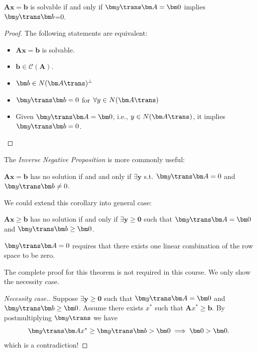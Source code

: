 \begin{corollary}
$\bm{Ax}=\bm b$ is solvable if and only if $\bm y\trans\bm A=\bm 0$ implies $\bm y\trans\bm b$=0.
\end{corollary}
\begin{proof} The following statements are equivalent:
\begin{itemize}
\item
$\bm{Ax}=\bm b$ is solvable.
\item
$\bm b\in \mathcal{C}(\bm A)$.
\item
$\bm b\in N(\bm A\trans)^{\perp}$
\item
$\bm y\trans\bm b=0$ for $\forall y\in N(\bm A\trans)$
\item
Given $\bm y\trans\bm A=\bm 0$, i.e., $y\in N(\bm A\trans)$, it implies $\bm y\trans\bm b=0$.
\end{itemize}
\end{proof}
The \emph{Inverse Negative Proposition} is more commonly useful:
\begin{corollary}
$\bm{Ax}=\bm b$ has no solution if and  and only if $\exists \bm y$ s.t. $\bm y\trans\bm A=0$ and $\bm y\trans\bm b\ne 0$.
\end{corollary}
We could extend this corollary into general case:
\begin{remark}
\begin{theorem}\label{theorem_12.3}
$\bm{Ax}\ge\bm b$ has no solution if and only if $\exists \bm y\ge\bm 0$ such that $\bm y\trans\bm A=\bm 0$ and $\bm y\trans\bm b\ge \bm 0$.
\end{theorem}
$\bm y\trans\bm A=0$ requires that there exists one linear combination of the row space to be zero.

The complete proof for this theorem is not required in this course. We only show the necessity case.
\begin{proof}[Necessity case.]
Suppose $\exists \bm y\ge\bm 0$ such that $\bm y\trans\bm A=\bm 0$ and $\bm y\trans\bm b\ge \bm 0$. Assume there exists $x^{*}$ such that $\bm Ax^{*}\ge\bm b$. By postmultiplying $\bm y\trans$ we have 
\[\bm y\trans\bm Ax^{*}\ge\bm y\trans\bm b>\bm 0
\implies 
\bm 0>\bm 0.
\]
which is a contradiction!
\end{proof}
\end{remark}

